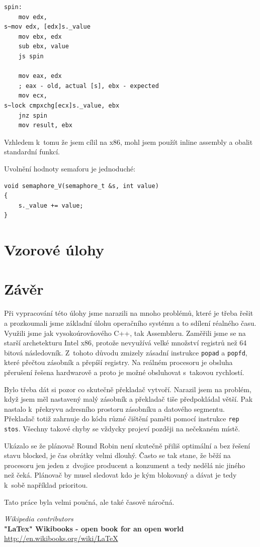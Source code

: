 \documentclass[a4paper,12pt]{article}
\begin{document}
\begin{lstlisting}
spin:
	mov edx,
s~mov edx, [edx]s._value
	mov ebx, edx
	sub ebx, value
	js spin

	mov eax, edx
	; eax - old, actual [s], ebx - expected
	mov ecx,
s~lock cmpxchg[ecx]s._value, ebx
	jnz spin
	mov result, ebx
\end{lstlisting}

\lstset{language=C++}

Vzhledem k~tomu že jsem cílil na x86, mohl jsem použít inline assembly
a obalit standardní funkcí.

Uvolnění hodnoty semaforu je jednoduché:

\begin{lstlisting}
void semaphore_V(semaphore_t &s, int value)
{
	s._value += value;
}
\end{lstlisting}

\section{Vzorové úlohy}

\section{Závěr}
Při vypracování této úlohy jsme narazili na mnoho problémů, které je třeba
řešit a prozkoumali jsme základní úlohu operačního systému a to sdílení réalného času.
Využili jsme jak vysokoúrovňového C++, tak Assembleru. Zaměřili jsme se na starší
archetekturu Intel x86, protože nevyužívá velké množství registrů než 64 bitová
následovník. Z~tohoto důvodu zmizely zásadní instrukce \texttt{popad} a \texttt{popfd},
které přečtou zásobník a přepíší registry. Na reálném procesoru je obsluha přerušení řešena
hardwarově a proto je možné obsluhovat s~takovou rychlostí.

Bylo třeba dát si pozor co skutečně překladač vytvoří. Narazil jsem na problém, když jsem
měl nastavený malý zásobník a překladač tiše předpokládal větší. Pak nastalo k~překryvu
adresního prostoru zásobníku a datového segmentu. Překladač totiž zahrnuje do kódu různé
čištění paměti pomocí instrukce \verb+rep stos+. Všechny takové chyby se vždycky projeví
později na nečekaném místě.

Ukázalo se že plánovač Round Robin není skutečně přiliš optimální a bez řešení stavu
blocked, je čas obrátky velmi dlouhý. Často se tak stane, že běží na procesoru jen jeden
z~dvojice producent a konzument a tedy nedělá nic jiného než čeká. Plánovač by musel
sledovat kdo je kým blokovaný a dávat je tedy k~sobě například prioritou.

Tato práce byla velmi poučná, ale také časově náročná.


\begin{thebibliography}{9}

{\em Wikipedia contributors} \\
{\bf "LaTex" Wikibooks - open book for an open world} \\
\url{http://en.wikibooks.org/wiki/LaTeX} \\

\end{thebibliography}
\end{document}
